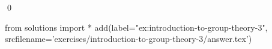 
\begin{ex} 
  \label{ex:introduction-to-group-theory-3}
  
  \qed
\end{ex} 
\begin{python0}
from solutions import *
add(label="ex:introduction-to-group-theory-3",
    srcfilename='exercises/introduction-to-group-theory-3/answer.tex') 
\end{python0}
